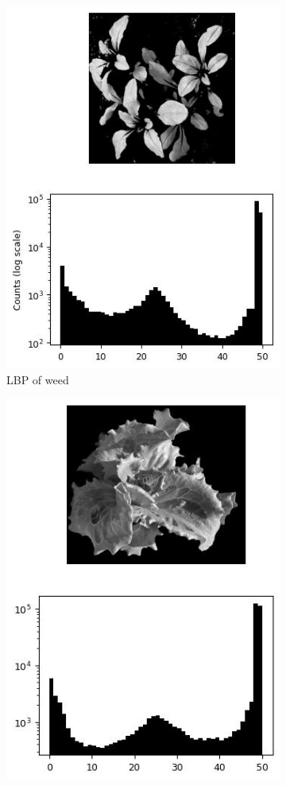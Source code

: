 \documentclass[letterpaper]{article}
\begin{document}
{%
%
\begin{figure}[H]
	\centering
	\begin{subfigure}{0.48\linewidth}
		\centering
		\includegraphics[scale=.4]{./figures/lbp-left.jpg}
		\caption{LBP of weed}
		\label{subfig:lbp-weed}	
	\end{subfigure}
	\begin{subfigure}{0.48\linewidth}
		\centering
		\includegraphics[scale=.4]{./figures/lbp-right.jpg}

\end{subfigure}
\end{figure}}
\end{document}
